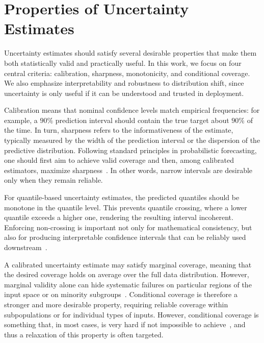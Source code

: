 \documentclass[11pt]{article}
\begin{document}
\vspace{-0.13cm}
\section{Properties of Uncertainty Estimates}
\vspace{-0.13cm}

Uncertainty estimates should satisfy several desirable properties that make them both statistically valid and practically useful. In this work, we focus on four central criteria: calibration, sharpness, monotonicity, and conditional coverage. We also emphasize interpretability and robustness to distribution shift, since uncertainty is only useful if it can be understood and trusted in deployment.

Calibration means that nominal confidence levels match empirical frequencies: for example, a \(90\%\) prediction interval should contain the true target about \(90\%\) of the time. In turn, sharpness refers to the informativeness of the estimate, typically measured by the width of the prediction interval or the dispersion of the predictive distribution. Following standard principles in probabilistic forecasting, one should first aim to achieve valid coverage and then, among calibrated estimators, maximize sharpness~\cite{gneiting2007strictly, chung2021beyond}. In other words, narrow intervals are desirable only when they remain reliable.

For quantile-based uncertainty estimates, the predicted quantiles should be monotone in the quantile level. This prevents quantile crossing, where a lower quantile exceeds a higher one, rendering the resulting interval  incoherent. Enforcing non-crossing is important not only for mathematical consistency, but also for producing interpretable confidence intervals that can be reliably used downstream~\cite{narayan2021regularization}.

A calibrated uncertainty estimate may satisfy marginal coverage, meaning that the desired coverage holds on average over the full data distribution. However, marginal validity alone can hide systematic failures on particular regions of the input space or on minority subgroups~\cite{angelopoulos2021gentle, zervaconformalizing}. Conditional coverage is therefore a stronger and more desirable property, requiring reliable coverage within subpopulations or for individual types of inputs. However, conditional coverage is something that, in most cases, is very hard if not impossible to achieve~\cite{vovk2012conditional}, and thus a relaxation of this property is often targeted.
\end{document}
